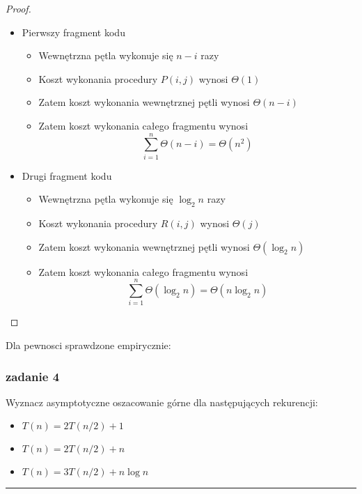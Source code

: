 \documentclass[11pt,a4paper]{article}
\begin{document}
\begin{proof}
    \begin{itemize}
        \item Pierwszy fragment kodu
            \begin{itemize}
                \item Wewnętrzna pętla wykonuje się $n-i$ razy
                \item Koszt wykonania procedury $P(i,j)$ wynosi $\Theta(1)$
                \item Zatem koszt wykonania wewnętrznej pętli wynosi $\Theta(n-i)$
                \item Zatem koszt wykonania całego fragmentu wynosi
                    \[
                        \sum_{i=1}^{n} \Theta(n-i) = \Theta(n^2)
                    \]
            \end{itemize}
        \item Drugi fragment kodu
            \begin{itemize}
                \item Wewnętrzna pętla wykonuje się $\log_2 n$ razy
                \item Koszt wykonania procedury $R(i,j)$ wynosi $\Theta(j)$
                \item Zatem koszt wykonania wewnętrznej pętli wynosi $\Theta(\log_2 n)$
                \item Zatem koszt wykonania całego fragmentu wynosi
                    \[
                        \sum_{i=1}^{n} \Theta(\log_2 n) = \Theta(n \log_2 n)
                    \]
            \end{itemize}
    \end{itemize}
\end{proof}
Dla pewnosci sprawdzone empirycznie:

\subsubsection{zadanie 4}
Wyznacz asymptotyczne oszacowanie górne dla następujących rekurencji:

\begin{itemize}
    \item $T(n) = 2T(n/2) + 1$
    \item $T(n) = 2T(n/2) + n$
    \item $T(n) = 3T(n/2) + n \log n$
\end{itemize}

\bigskip
\hrule
\bigskip
\end{document}
